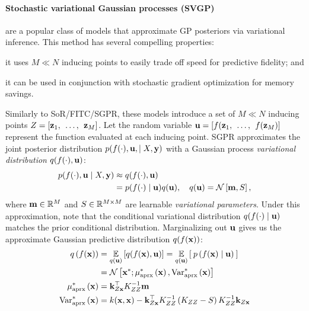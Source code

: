 \paragraph{Stochastic variational Gaussian processes (SVGP)}
\cite{hensman2013gaussian,hensman2015scalable,matthews2016sparse} are a popular class of models that approximate GP posteriors via variational inference.
This method has several compelling properties:
\begin{enumerate*}
  \item it uses $M \ll N$ inducing points to easily trade off speed for predictive fidelity; and
  \item it can be used in conjunction with stochastic gradient optimization for memory savings.
\end{enumerate*}

Similarly to SoR/FITC/SGPR, these models introduce a set of $M \ll N$ inducing points $Z = [\mathbf{z}_1, \:\: \ldots, \:\: \mathbf{z}_M]$.
Let the random variable $\mathbf{u} = [f(\mathbf{z}_1, \:\: \ldots, \:\: f(\mathbf{z}_M)]$ represent the function evaluated at each inducing point.
SGPR approximates the joint posterior distribution $p( f(\cdot), \mathbf{u}, \mid X, \mathbf{y})$ with a Gaussian process \emph{variational distribution} $q(f(\cdot), \mathbf{u})$:
%
\begin{align*}
  p(f(\cdot), \bu \mid \bX, \by) &\approx q(f(\cdot), \bu)
  \\
  &= p(f(\cdot) \mid \bu) q(\bu),
  \quad
  q(\bu) = \normaldist{\bm}{\bS},
\end{align*}
%
where $\mathbf{m} \in \mathbb{R}^M$ and $S \in \mathbb{R}^{M \times M}$ are learnable \emph{variational parameters}.
Under this approximation, note that the conditional variational distribution $q(f(\cdot) \mid \mathbf{u})$ matches the prior conditional distribution.
Marginalizing out $\mathbf{u}$ gives us the approximate Gaussian predictive distribution $q( f(\mathbf{x}) )$:
%
\begin{align}
  q \left( f(\bx) \right) &= \Evover{q(\bu)}{ q( f(\bx), \bu) }
  = \Evover{q(\bu)}{ \: p\left( f(\bx) \mid \bu \right) \: }
  \nonumber \\
  &= \normaldist{ \bxtest; \ameantest{ \bx }} { \avartest{ \bx }}
  \nonumber
  \\
  \ameantest{\bx} &= \bk_{\bZ\bx}^\top \bK_{\bZ\bZ}^{-1} \bm
  \label{eqn:approx_pred_mean} \\
  \avartest{\bx} &= k(\bx, \bx) -
    \bk_{\bZ\bx}^\top \bK_{\bZ\bZ}^{-1} \left( \bK_{\bZ\bZ} - \bS \right) \bK_{\bZ\bZ}^{-1} \bk_{\bZ\bx}
  \label{eqn:approx_pred_covar}
\end{align}
